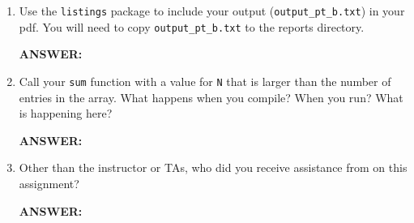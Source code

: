 \begin{enumerate}
    \item Use the \texttt{listings} package to include your output (\texttt{output\_pt\_b.txt}) in your pdf.  You will need to copy \texttt{output\_pt\_b.txt} to the reports directory.

    \textbf{ANSWER:} %

    \item Call your \texttt{sum} function with a value for \texttt{N} that is larger than the number of entries in the array.  What happens when you compile?  When you run?  What is happening here?

    \textbf{ANSWER:} %

    \item Other than the instructor or TAs, who did you receive assistance from on this assignment?
    
    \textbf{ANSWER:} %
\end{enumerate}
